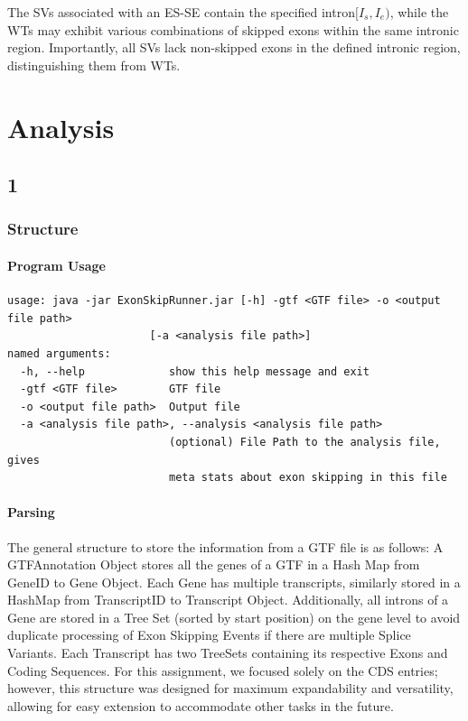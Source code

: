 \documentclass{article}
\begin{document}
    The SVs associated with an ES-SE contain the specified intron\( [I_s, I_e)\), while the WTs may exhibit various combinations of skipped exons within the same intronic region. Importantly, all SVs lack non-skipped exons in the defined intronic region, distinguishing them from WTs.


    \section{Analysis}

    \subsection{1}

    \subsubsection{Structure}

    \paragraph{Program Usage}
    \begin{verbatim}
usage: java -jar ExonSkipRunner.jar [-h] -gtf <GTF file> -o <output file path>
                      [-a <analysis file path>]
named arguments:
  -h, --help             show this help message and exit
  -gtf <GTF file>        GTF file
  -o <output file path>  Output file
  -a <analysis file path>, --analysis <analysis file path>
                         (optional) File Path to the analysis file, gives
                         meta stats about exon skipping in this file
    \end{verbatim}

    \paragraph{Parsing}
    The general structure to store the information from a GTF file is as follows: A GTFAnnotation Object stores all the genes of a GTF in a Hash Map from GeneID to Gene Object. Each Gene has multiple transcripts, similarly stored in a HashMap from TranscriptID to Transcript Object. Additionally, all introns of a Gene are stored in a Tree Set (sorted by start position) on the gene level to avoid duplicate processing of Exon Skipping Events if there are multiple Splice Variants. Each Transcript has two TreeSets containing its respective Exons and Coding Sequences. For this assignment, we focused solely on the CDS entries; however, this structure was designed for maximum expandability and versatility, allowing for easy extension to accommodate other tasks in the future.
\end{document}

